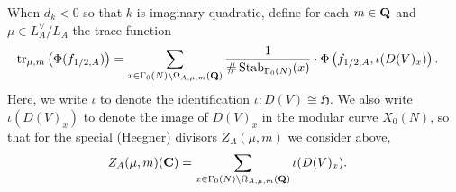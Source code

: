 \documentclass{amsart}
\theoremstyle{definition}
\theoremstyle{definition}
\theoremstyle{definition}
\begin{document}
When $d_k < 0$ so that $k$ is imaginary quadratic, define for each $m \in {\bf{Q}}$ and $\mu \in L_A^{\vee}/L_A$ the trace function 
\begin{align*} \operatorname{tr}_{\mu, m}\left( \Phi(f_{1/2, A}) \right) 
&= \sum\limits_{ x \in \Gamma_0(N) \backslash \Omega_{A, \mu, m}({\bf{Q}}) }
\frac{1}{\# \operatorname{Stab}_{\Gamma_0(N)}(x) } \cdot \Phi \left( f_{1/2, A}, \iota(D(V)_x) \right). \end{align*}
Here, we write $\iota$ to denote the identification $\iota: D(V) \cong \mathfrak{H}$. We also write 
$\iota(D(V)_x)$ to denote the image of $D(V)_x$ in the modular curve $X_0(N)$, so that for the special (Heegner) divisors $Z_A(\mu, m)$ we consider above,
\begin{align*} Z_A(\mu, m)({\bf{C}}) &= \sum\limits_{ x \in \Gamma_0(N) \backslash \Omega_{A, \mu, m}({\bf{Q}}) } \iota(D(V)_x). \end{align*}
\end{document}
